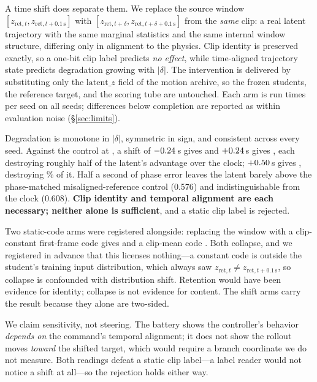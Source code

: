 \documentclass[conference]{IEEEtran}
\newcommand{\ETimeAmb}{0.608}
\newcommand{\EShuffledAmb}{0.576}
\begin{document}
A time shift does separate them.  We replace the source window
$[z_{\mathrm{ret},t},z_{\mathrm{ret},t+0.1\,\mathrm{s}}]$ with
$[z_{\mathrm{ret},t+\delta},z_{\mathrm{ret},t+\delta+0.1\,\mathrm{s}}]$ from the
\emph{same} clip: a real latent trajectory with the same marginal statistics and the same
internal window structure, differing only in alignment to the physics.  Clip identity is
preserved exactly, so a one-bit clip label predicts \emph{no effect}, while time-aligned
trajectory state predicts degradation growing with $|\delta|$.  The intervention is
delivered by substituting only the $\mathrm{latent}\_z$ field of the motion archive, so the
frozen students, the reference target, and the scoring tube are untouched.  Each arm is run
\EPhaseRepeats{} times per seed on all \EPhaseSeeds{} seeds; differences below
\EPhaseFloor{} completion are reported as within evaluation noise
(\S\ref{sec:limits}).

Degradation is monotone in $|\delta|$, symmetric in sign, and consistent across every seed.
Against the control at \EPhaseControlCompletion{}, a shift of
$-0.24$\,s gives \EPhaseShiftMinusQuarterCompletion{} and
$+0.24$\,s gives \EPhaseShiftPlusQuarterCompletion{}, each
destroying roughly half of the latent's \EPhaseClockAdvantage{} advantage over the clock;
$+0.50$\,s gives \EPhaseShiftPlusHalfCompletion{}, destroying
\EPhaseShiftPlusHalfLostPercent\% of it.  Half a second of phase error leaves the latent
barely above the phase-matched misaligned-reference control (\EShuffledAmb{}) and
indistinguishable from the clock (\ETimeAmb{}).  \textbf{Clip identity and temporal
alignment are each necessary; neither alone is sufficient}, and a static clip label is
rejected.

Two static-code arms were registered alongside: replacing the window with a clip-constant
first-frame code gives \EPhaseFirstFrameCompletion{} and a clip-mean code
\EPhaseClipMeanCompletion{}.  Both collapse, and we registered in advance that this
licenses nothing---a constant code is outside the student's training input distribution,
which always saw $z_{\mathrm{ret},t}\neq z_{\mathrm{ret},t+0.1\,\mathrm{s}}$, so collapse
is confounded with distribution shift.  Retention would have been evidence for identity;
collapse is not evidence for content.  The shift arms carry the result because they alone
are two-sided.

We claim sensitivity, not steering.  The battery shows the controller's behavior
\emph{depends on} the command's temporal alignment; it does not show the rollout moves
\emph{toward} the shifted target, which would require a branch coordinate we do not
measure.  Both readings defeat a static clip label---a label reader would not notice a
shift at all---so the rejection holds either way.
\end{document}
